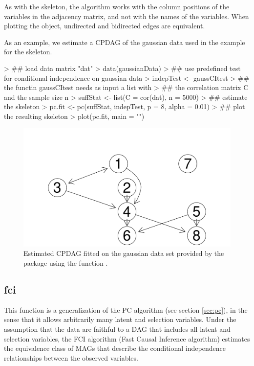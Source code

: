 \documentclass[article]{jss}
\begin{document}
As with the skeleton, the algorithm works with the column positions of the
variables in the adjacency matrix, and not with the names of the
variables. When plotting the object, undirected and bidirected edges are
equivalent.


As an example, we estimate a CPDAG of the gaussian data used in the example
for the skeleton.

\begin{Schunk}
\begin{Sinput}
> ## load data matrix "dat"
> data(gaussianData)
> ## use predefined test for conditional independence on gaussian data
> indepTest <- gaussCItest 
> ## the functin gaussCItest needs as input a list with
> ## the correlation matrix C and the sample size n
> suffStat <- list(C = cor(dat), n = 5000)
> ## estimate the skeleton
> pc.fit <- pc(suffStat, indepTest, p = 8, alpha = 0.01)
> ## plot the resulting skeleton
> plot(pc.fit, main = "")
\end{Sinput}
\end{Schunk}
\begin{figure}
  \begin{center}
\includegraphics{pcalgDoc-011}
\caption{Estimated CPDAG fitted on the gaussian data set provided by the
  package using the function .}
\label{fig:pcFit1}
\end{center}
\end{figure}

\subsection{fci}
This function is a generalization of the PC algorithm (see section
\ref{sec:pc}), in the sense that it allows arbitrarily many latent and
selection variables. Under the assumption that the data are faithful to a
DAG that includes all latent and selection variables, the FCI algorithm
(Fast Causal Inference algorithm) estimates the equivalence class of MAGs
that describe the conditional independence relationships between the
observed variables.
\end{document}
